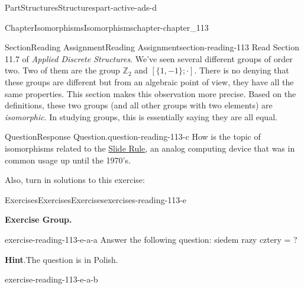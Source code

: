 \documentclass[oneside,10pt,]{book}
\newcommand{\blocktitlefont}{\relax}
\numberwithin{equation}{section}
\begin{document}
\begin{partptx}{Part}{Structures}{}{Structures}{}{}{part-active-ads-d}
%
\typeout{************************************************}
\typeout{************************************************}
%
\begin{chapterptx}{Chapter}{Isomorphisms}{}{Isomorphisms}{}{}{chapter-chapter_113}
\renewcommand*{\chaptername}{Chapter}
%
%
%
\typeout{************************************************}
\typeout{************************************************}
%
\begin{sectionptx}{Section}{Reading Assignment}{}{Reading Assignment}{}{}{section-reading-113}
Read Section 11.7  of \emph{Applied Discrete Structures}.  We've seen several different groups of order two. Two of them are the group \(\mathbb{Z}_2\) and \([\{1,-1\}; \cdot]\).  There is no denying that these groups are different but from an algebraic point of view, they have all the same properties.   This section makes this observation more precise.  Based on the definitions, these two groups (and all other groups with two elements) are \emph{isomorphic}.  In studying groups, this is essentially saying they are all equal.%
\begin{question}{Question}{Response Question.}{question-reading-113-c}%
How is the topic of isomorphisms related to the \hyperref[figure-fig-slide-rule]{Slide Rule}, an analog computing device that was in common usage up until the 1970's.%
\end{question}
Also, turn in solutions to this exercise:%
%
%
\typeout{************************************************}
\typeout{************************************************}
%
\begin{exercises-subsection-numberless}{Exercises}{Exercises}{}{Exercises}{}{}{exercises-reading-113-e}
\par\medskip\noindent%
\textbf{Exercise Group.}\space\space%
\begin{exercisegroup}
\begin{divisionexerciseeg}{1}{}{}{exercise-reading-113-e-a-a}%
Answer the following question:  siedem razy cztery = \textunderscore{}\textunderscore{}\textunderscore{}\textunderscore{}\textunderscore{}?%
\par\smallskip%
\noindent\textbf{\blocktitlefont Hint}.\hypertarget{hint-reading-113-e-a-a-b}{}\quad{}The question is in Polish.%
\end{divisionexerciseeg}%
\begin{divisionexerciseeg}{2}{}{}{exercise-reading-113-e-a-b}%

\end{divisionexerciseeg}
\end{exercisegroup}
\end{exercises-subsection-numberless}
\end{sectionptx}
\end{chapterptx}
\end{partptx}
\end{document}
